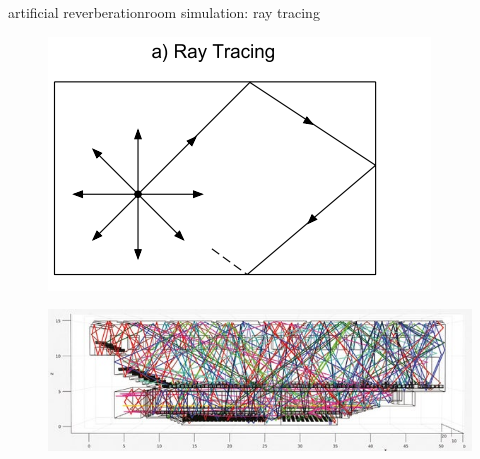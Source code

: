 \begin{frame}{artificial reverberation}{room simulation: ray tracing}
	\begin{figure}
		\centerline{\includegraphics[scale=.4]{graph/raummodell1}}
	\end{figure}
	\begin{figure}
		\centerline{\includegraphics[scale=.4]{graph/raytracing}}
	\end{figure}
    
    
\end{frame}

